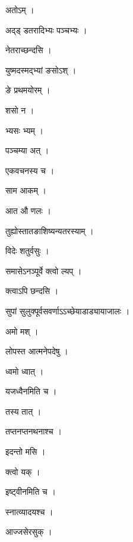 \documentclass[10pt, openany]{book}
\begin{document}
\noindent अतोऽम् ।

\noindent अद्ड् डतरादिभ्यः पञ्चभ्यः ।

\noindent नेतराच्छन्दसि ।

\noindent युष्मदस्मद्भ्यां ङसोऽश् ।

\noindent ङे प्रथमयोरम् ।

\noindent शसो न ।

\noindent भ्यसः भ्यम् ।

\noindent पञ्चम्या अत् ।

\noindent एकवचनस्य च ।

\noindent साम आकम् ।

\noindent आत औ णलः ।

\noindent तुह्योस्तातङाशिष्यन्यतरस्याम् ।

\noindent विदेः शतुर्वसुः ।

\noindent समासेऽनञ्पूर्वे क्त्वो ल्यप् ।

\noindent क्त्वाऽपि छन्दसि ।

\noindent सुपां सुलुक्पूर्वसवर्णाऽऽच्छेयाडाड्यायाजालः ।

\noindent अमो मश् ।

\noindent लोपस्त आत्मनेपदेषु ।

\noindent ध्वमो ध्वात् ।

\noindent यजध्वैनमिति च ।

\noindent तस्य तात् ।

\noindent तप्तनप्तनथनाश्च ।

\noindent इदन्तो मसि ।

\noindent क्त्वो यक् ।

\noindent इष्ट्वीनमिति च ।

\noindent स्नात्व्यादयश्च ।

\noindent आज्जसेरसुक् ।
\end{document}

